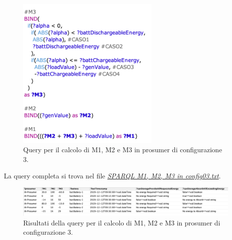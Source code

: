 \begin{figure}[H]
    \centering
    \includegraphics[width=7cm]{images/query_m3.png}
    \caption{Query per il calcolo di M1, M2 e M3 in prosumer di configurazione 3.}
    \label{fig:query_m3}
\end{figure}

La query completa si trova nel file \href{https://github.com/19eddie/SemanticWeb-Assignment02-03/blob/main/SPARQL%20M1%2C%20M2%2C%20M3%20in%20config03.txt}{\textit{SPARQL M1, M2, M3 in config03.txt}}.


\begin{figure}[H]
    \centering
    \includegraphics[width=15cm]{images/query_m3_res.png}
    \caption{Risultati della query per il calcolo di M1, M2 e M3 in prosumer di configurazione 3.}
    \label{fig:query_m3_res}
\end{figure}